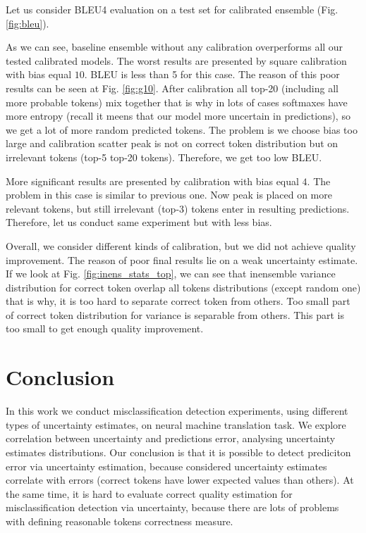 \documentclass[a4paper,14pt]{extarticle}
\begin{document}
	Let us consider BLEU4 evaluation on a test set for calibrated ensemble (Fig. \ref{fig:bleu}).
	
	As we can see, baseline ensemble without any calibration overperforms all our tested calibrated models. The worst results are presented by square calibration with bias equal $10$. BLEU is less than 5 for this case. The reason of this poor results can be seen at Fig. \ref{fig:g10}. After calibration all top-20 (including all more probable tokens) mix together that is why in lots of cases softmaxes have more entropy (recall it meens that our model more uncertain in predictions), so we get a lot of more random predicted tokens. The problem is we choose bias too large and calibration scatter peak is not on correct token distribution but on irrelevant tokens (top-5 top-20 tokens). Therefore, we get too low BLEU.
	
	More significant results are presented by calibration with bias equal $4$. The problem in this case is similar to previous one. Now peak is placed on more relevant tokens, but still irrelevant (top-3) tokens enter in resulting predictions. Therefore, let us conduct same experiment but with less bias.
	
	Overall, we consider different kinds of calibration, but we did not achieve quality improvement. The reason of poor final results lie on a weak uncertainty estimate. If we look at Fig. \ref{fig:inens_stats_top}, we can see that inensemble variance distribution for correct token overlap all tokens distributions (except random one) that is why, it is too hard to separate correct token from others. Too small part of correct token distribution for variance is separable from others. This part is too small to get enough quality improvement.
\section{Conclusion}
	In this work we conduct misclassification detection experiments, using different types of uncertainty estimates, on neural machine translation task. We explore correlation between uncertainty and predictions error, analysing uncertainty estimates distributions. Our conclusion is that it is possible to detect prediciton error via uncertainty estimation, because considered uncertainty estimates correlate with errors (correct tokens have lower expected values than others). At the same time, it is hard to evaluate correct quality estimation for misclassification detection via uncertainty, because there are lots of problems with defining reasonable tokens correctness measure.
	
\end{document}
